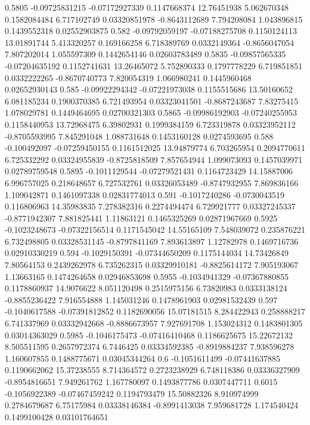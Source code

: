 {0.5805 -0.09725831215 -0.07172927339 0.1147668374 12.76451938 5.062670348 0.1582084484 6.717102749 0.03320851978 -0.8643112689 7.794208084 1.043896815 0.1439552318 0.02552903875
0.582 -0.09792059197 -0.07188275708 0.1150124113 13.01891744 5.413320257 0.169166258 6.718389769 0.0332149364 -0.8656047054 7.807202014 1.055597309 0.1442654146 0.02603783489
0.5835 -0.09857565335 -0.07204635192 0.1152741631 13.26465072 5.752890333 0.1797778229 6.719851851 0.0332222265 -0.8670740773 7.820054319 1.066980241 0.1445960468 0.02652930143
0.585 -0.09922294342 -0.07221973038 0.1155515686 13.50160652 6.081185234 0.1900370385 6.721493954 0.03323041501 -0.8687243687 7.83275415 1.078029781 0.1449464695 0.02700321303
0.5865 -0.09986192903 -0.07240255953 0.1158440953 13.72968475 6.39802931 0.1999384159 6.723319878 0.03323952112 -0.8705593995 7.845291048 1.088731648 0.1453160128 0.0274593695
0.588 -0.100492097 -0.07259450155 0.1161512025 13.94879774 6.703265954 0.2094770611 6.725332292 0.03324955839 -0.8725818509 7.857654944 1.099073093 0.1457039971 0.02789759548
0.5895 -0.1011129544 -0.07279521431 0.1164723429 14.15887006 6.996757025 0.218648657 6.727532761 0.03326053489 -0.8747932955 7.869836166 1.109042871 0.1461097338 0.02831774013
0.591 -0.1017240286 -0.0730043519 0.116806963 14.35983835 7.278382316 0.2274494474 6.729921777 0.03327245337 -0.8771942307 7.881825441 1.11863121 0.1465325269 0.02871967669
0.5925 -0.1023248673 -0.07322156514 0.1171545042 14.55165109 7.548039072 0.235876221 6.732498805 0.03328531145 -0.8797841169 7.893613897 1.12782978 0.1469716736 0.02910330219
0.594 -0.1029150391 -0.07344650209 0.1175144034 14.73426849 7.80564153 0.2439262978 6.735262315 0.03329910181 -0.8825614172 7.905193067 1.13663165 0.1474264658 0.02946853698
0.5955 -0.1034941329 -0.07367880855 0.1178860937 14.9076622 8.051120498 0.2515975156 6.73820983 0.0333138124 -0.8855236422 7.916554888 1.145031246 0.1478961903 0.02981532439
0.597 -0.1040617588 -0.07391812852 0.1182690056 15.07181515 8.284422943 0.258888217 6.741337969 0.03332942668 -0.8886673957 7.927691708 1.153024312 0.1483801305 0.03014363029
0.5985 -0.1046175473 -0.07416410468 0.1186625675 15.22672132 8.505511595 0.2657972374 6.7446425 0.03334592385 -0.8919884237 7.938596278 1.160607855 0.1488775671 0.03045344264
0.6 -0.1051611499 -0.07441637885 0.1190662062 15.37238555 8.714364572 0.2723238929 6.748118386 0.03336327909 -0.8954816651 7.949261762 1.167780097 0.1493877786 0.0307447711
0.6015 -0.1056922389 -0.07467459242 0.1194793479 15.50882326 8.910974999 0.2784679687 6.75175984 0.03338146384 -0.8991413038 7.959681728 1.174540424 0.1499100428 0.03101764651
}
